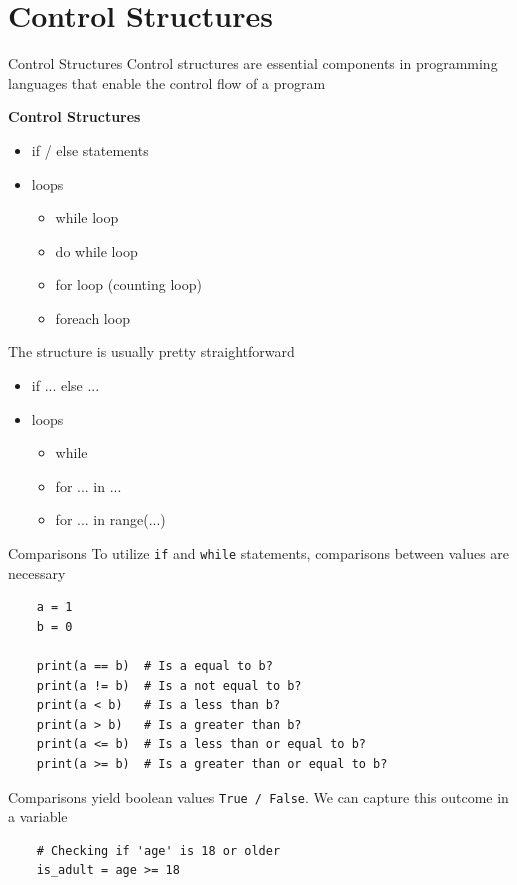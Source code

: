 \documentclass[
	11pt, 
]{beamer}
\begin{document}
\section{Control Structures}
\begin{frame}{Control Structures}
Control structures are essential components in programming languages that enable the control flow of a program

\begin{block}{\textbf{Control Structures}}
\begin{itemize}
\item if / else statements
\item loops
\begin{itemize}
    \item while loop
    \item do while loop
    \item for loop (counting loop)
    \item foreach loop
\end{itemize}
\end{itemize}

\end{block}

The structure is usually pretty straightforward

\begin{itemize}
\item if ... else ...
\item loops
\begin{itemize}
    \item while
    \item for ... in ...
    \item for ... in range(...)
\end{itemize}
\end{itemize}
\end{frame}


\begin{frame}[fragile]{Comparisons}
To utilize \texttt{if} and \texttt{while} statements, comparisons between values are necessary

\begin{verbatim}
    a = 1
    b = 0
    
    print(a == b)  # Is a equal to b?
    print(a != b)  # Is a not equal to b?
    print(a < b)   # Is a less than b?
    print(a > b)   # Is a greater than b?
    print(a <= b)  # Is a less than or equal to b?
    print(a >= b)  # Is a greater than or equal to b?

\end{verbatim}

Comparisons yield boolean values \texttt{True / False}. We can capture this outcome in a variable

\begin{verbatim}
    # Checking if 'age' is 18 or older
    is_adult = age >= 18  
\end{verbatim}


\end{frame}
\end{document}
